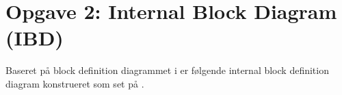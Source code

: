 \section{Opgave 2: Internal Block Diagram (IBD)}

Baseret på block definition diagrammet i  er følgende internal block definition diagram konstrueret som set på .

